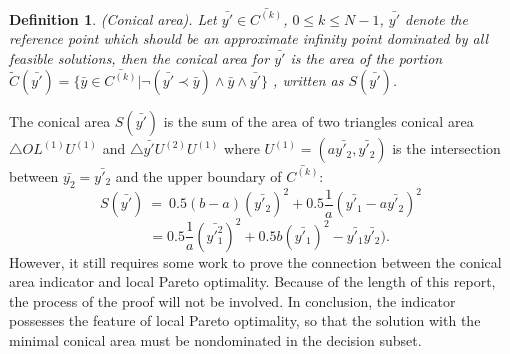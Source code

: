\documentclass[a4paper, 11pt]{article}
\newtheorem{mydef}{Definition}
\begin{document}
\begin{mydef}\emph{(Conical area).}
Let $\bar{y'}\in\bar{C^{(k)}}$, $0\le k\le N-1$, $\bar{y'}$ denote the reference point which should be an approximate infinity point dominated by all feasible solutions, then the conical area for $\bar{y'}$ is the area of the portion $\tilde{C}(\bar{y'})=\{\bar{y}\in\bar{C^{(k)}}|\neg(\bar{y'}\prec\bar{y})\wedge\bar{y}\wedge\bar{y'}\}$
, written as $S(\bar{y'})$.
\end{mydef}
The conical area $S(\bar{y'})$ is the sum of the area of two triangles conical area $\triangle OL^{(1)}U^{(1)}$ and $\triangle \bar{y'}U^{(2)}U^{(1)}$ where $U^{(1)}=(a\bar{y'_2},\bar{y'_2})$ is the intersection between $\bar{y_2}=\bar{y'_2}$ and the upper boundary of $\bar{C^{(k)}}$:
$$
S(\bar{y'})\ =\ 0.5(b-a)(\bar{y'_2})^2+0.5\frac{1}{a}(\bar{y'_1}-a\bar{y'_2})^2
$$
\begin{equation}
\quad\, =0.5\frac{1}{a}(\bar{y'^2_1})^2+0.5b(\bar{y'_1})^2-\bar{y'_1}\bar{y'_2}).
\end{equation}
However, it still requires some work to prove the connection between the conical area indicator and local Pareto optimality.
Because of the length of this report, the process of the proof will not be involved.
In conclusion, the indicator possesses the feature of local Pareto optimality,
so that the solution with the minimal conical area must be nondominated in the decision subset.
\end{document}
